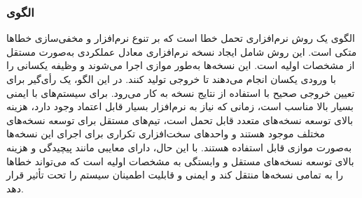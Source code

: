 \subsubsection{الگوی }
\label{ArmoushSWNVerProgSec}
\begin{RTL}
الگوی 
\cite{ref5} یک روش نرم‌افزاری تحمل خطا
است که بر تنوع نرم‌افزار و مخفی‌سازی خطاها متکی است.
این روش شامل ایجاد  نسخه نرم‌افزاری معادل عملکردی
 به‌صورت مستقل از مشخصات اولیه است.
این نسخه‌ها به‌طور موازی اجرا می‌شوند و وظیفه یکسانی را با
ورودی یکسان انجام می‌دهند تا  خروجی تولید کنند.
در این الگو، یک رأی‌گیر برای تعیین خروجی صحیح با استفاده از نتایج
 نسخه به کار می‌رود.  برای سیستم‌های با ایمنی بسیار بالا مناسب است،
زمانی که نیاز به نرم‌افزار بسیار قابل اعتماد وجود دارد،
هزینه بالای توسعه نسخه‌های متعدد قابل تحمل است، تیم‌های مستقل برای توسعه نسخه‌های
مختلف موجود هستند و واحدهای سخت‌افزاری تکراری برای اجرای این
نسخه‌ها به‌صورت موازی قابل استفاده هستند. با این حال، 
دارای معایبی مانند پیچیدگی و هزینه بالای توسعه نسخه‌های مستقل
و وابستگی به مشخصات اولیه است که می‌تواند خطاها را به تمامی نسخه‌ها
منتقل کند و ایمنی و قابلیت اطمینان سیستم را تحت تأثیر قرار دهد.
\end{RTL}